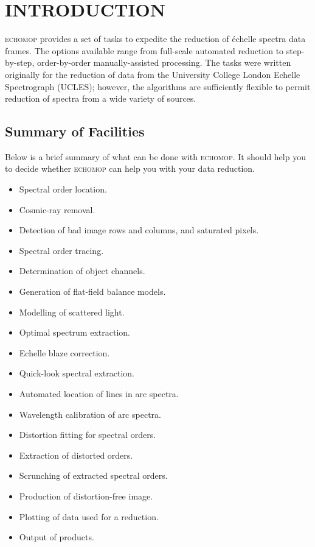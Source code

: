 \documentclass[twoside,11pt,nolof]{starlink}
\newcommand{\mlabel}[1]{\xlabel{#1}\label{#1}}
\begin{document}
\scfrontmatter

\section{\mlabel{introduction}INTRODUCTION}

\textsc{echomop} provides a set of tasks to expedite the reduction of \'{e}chelle
spectra data frames.  The options available range from full-scale
automated reduction to step-by-step, order-by-order manually-assisted
processing.  The tasks were written originally for the reduction of
data from the University College London Echelle Spectrograph (UCLES);
however, the algorithms are sufficiently flexible to permit reduction of
spectra from a wide variety of sources.


\subsection{\mlabel{facilities}Summary of Facilities}

Below is a brief summary of what can be done with \textsc{echomop}.
It should help you to decide whether \textsc{echomop} can help you with your
data reduction.

\begin{itemize}

\item Spectral order location.
\item Cosmic-ray removal.
\item Detection of bad image rows and columns, and saturated pixels.
\item Spectral order tracing.
\item Determination of object channels.
\item Generation of flat-field balance models.
\item Modelling of scattered light.
\item Optimal spectrum extraction.
\item Echelle blaze correction.
\item Quick-look spectral extraction.
\item Automated location of lines in arc spectra.
\item Wavelength calibration of arc spectra.
\item Distortion fitting for spectral orders.
\item Extraction of distorted orders.
\item Scrunching of extracted spectral orders.
\item Production of distortion-free image.
\item Plotting of data used for a reduction.
\item Output of products.

\end{itemize}
\end{document}
